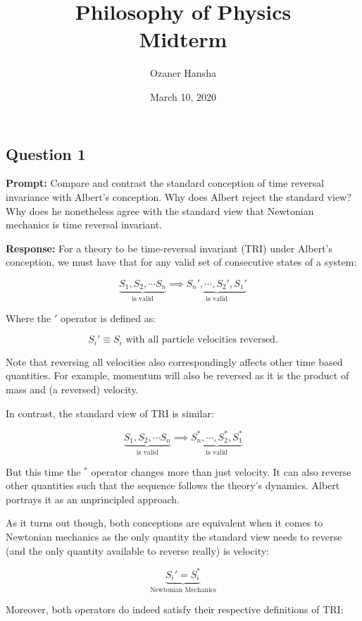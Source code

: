 \documentclass{article}
\begin{document}
\title{Philosophy of Physics\\ Midterm}
\author{Ozaner Hansha}
\date{March 10, 2020}
\maketitle

\subsection*{Question 1}
\noindent\textbf{Prompt:}  Compare and contrast the standard conception of time reversal invariance with Albert’s conception. Why does Albert reject the standard view? Why does he nonetheless agree with the standard view that Newtonian mechanics is time reversal invariant.
\bigskip

\noindent\textbf{Response:} For a theory to be time-reversal invariant (TRI) under Albert's conception, we must have that for any valid set of consecutive states of a system:

$$\underbrace{S_1,S_2,\cdots S_n}_{\text{is valid}}\implies \underbrace{S_n',\cdots,S_2',S_1'}_{\text{is valid}}$$

Where the $'$ operator is defined as:

$$S_i'\equiv S_i\text{ with all particle velocities reversed.}$$

Note that reversing all velocities also correspondingly affects other time based quantities. For example, momentum will also be reversed as it is the product of mass and (a reversed) velocity.
\smallskip

In contrast, the standard view of TRI is similar:

$$\underbrace{S_1,S_2,\cdots S_n}_{\text{is valid}}\implies \underbrace{S_n^*,\cdots,S_2^*,S_1^*}_{\text{is valid}}$$

But this time the $^*$ operator changes more than just velocity. It can also reverse other quantities such that the sequence follows the theory's dynamics. Albert portrays it as an unprincipled approach.

As it turns out though, both conceptions are equivalent when it comes to Newtonian mechanics as the only quantity the standard view needs to reverse (and the only quantity available to reverse really) is velocity:

$$\underbrace{S_i'=S_i^*}_{\text{Newtonian Mechanics}}$$

Moreover, both operators do indeed satisfy their respective definitions of TRI:
\end{document}
